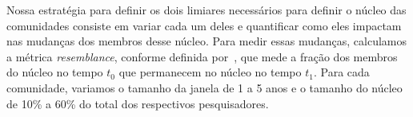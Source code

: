 Nossa estratégia para definir os dois limiares necessários para definir o núcleo das 
comunidades consiste em variar cada um deles e quantificar como eles impactam nas 
mudanças dos membros desse núcleo. Para medir essas mudanças, calculamos a
métrica \textit{resemblance}, conforme definida por~\cite{Viswanath2009}, que mede a 
fração dos membros do núcleo no tempo $t_0$ que permanecem no núcleo no tempo $t_1$.
Para cada comunidade, variamos o tamanho da janela de 1 a 5 anos e o tamanho do 
núcleo de 10\% a 60\% do total dos respectivos pesquisadores.

